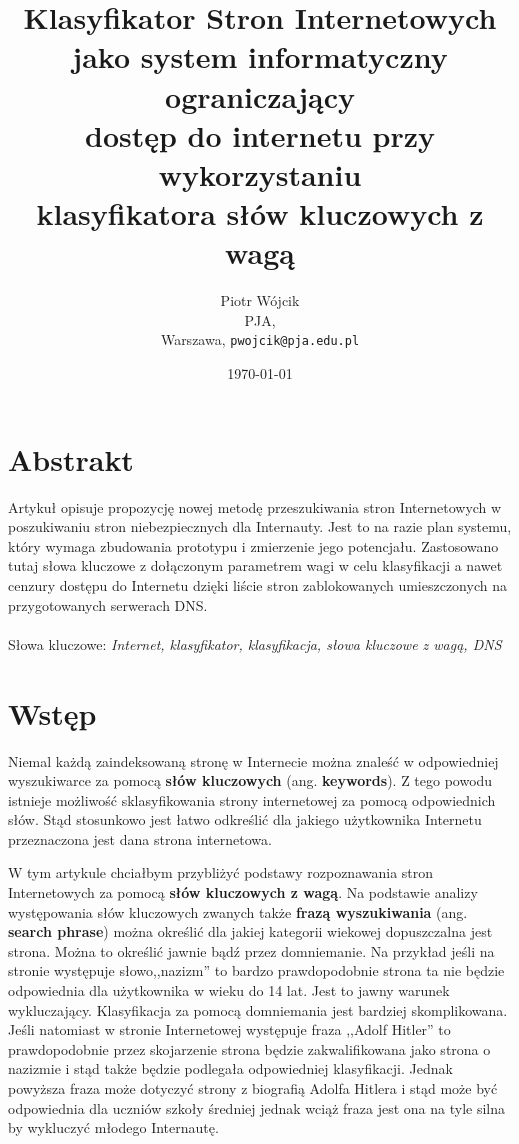 \documentclass[10pt,twoside,a4paper]{article}
\title{Klasyfikator Stron Internetowych\\ jako system informatyczny ograniczający\\ dostęp do internetu przy wykorzystaniu\\ klasyfikatora słów kluczowych z wagą\\}
\author{Piotr Wójcik\\
    PJA,\\
    Warszawa,
    \texttt{pwojcik@pja.edu.pl}}
\date{\today}
\begin{document}
\maketitle



\section{Abstrakt}
\indent Artykuł opisuje propozycję nowej metodę przeszukiwania stron Internetowych w poszukiwaniu stron niebezpiecznych dla Internauty. Jest to na razie plan systemu, który wymaga zbudowania prototypu i zmierzenie jego potencjału. Zastosowano tutaj słowa kluczowe z dołączonym parametrem wagi w celu klasyfikacji a nawet cenzury dostępu do Internetu dzięki liście stron zablokowanych umieszczonych na przygotowanych serwerach DNS.\\
\\
Słowa kluczowe:
\textit{Internet, klasyfikator, klasyfikacja, słowa kluczowe z wagą, DNS}

\section{Wstęp}

\indent Niemal każdą zaindeksowaną stronę w Internecie można znaleść w odpowiedniej wyszukiwarce za pomocą \textbf{słów kluczowych} (ang.\textbf{ keywords}). Z tego powodu istnieje możliwość sklasyfikowania strony internetowej za pomocą odpowiednich słów. Stąd stosunkowo jest łatwo odkreślić dla jakiego użytkownika Internetu przeznaczona jest dana strona internetowa.

W tym artykule chciałbym przybliżyć podstawy rozpoznawania stron Internetowych za pomocą \textbf{słów kluczowych z wagą}. Na podstawie analizy występowania słów kluczowych zwanych także \textbf{frazą wyszukiwania} (ang. \textbf{search phrase}) można określić dla jakiej kategorii wiekowej dopuszczalna jest strona. Można to określić jawnie bądź przez domniemanie. Na przykład jeśli na stronie występuje słowo,,nazizm'' to bardzo prawdopodobnie strona ta nie będzie odpowiednia dla użytkownika w wieku do 14 lat. Jest to jawny warunek wykluczający. Klasyfikacja za pomocą domniemania jest bardziej skomplikowana. Jeśli natomiast w stronie Internetowej występuje fraza ,,Adolf Hitler'' to prawdopodobnie przez skojarzenie strona będzie zakwalifikowana jako strona o nazizmie i stąd także będzie podlegała odpowiedniej klasyfikacji. Jednak powyższa fraza może dotyczyć strony z biografią Adolfa Hitlera i stąd może być odpowiednia dla uczniów szkoły średniej jednak wciąż fraza jest ona na tyle silna by wykluczyć młodego Internautę. 
\end{document}
